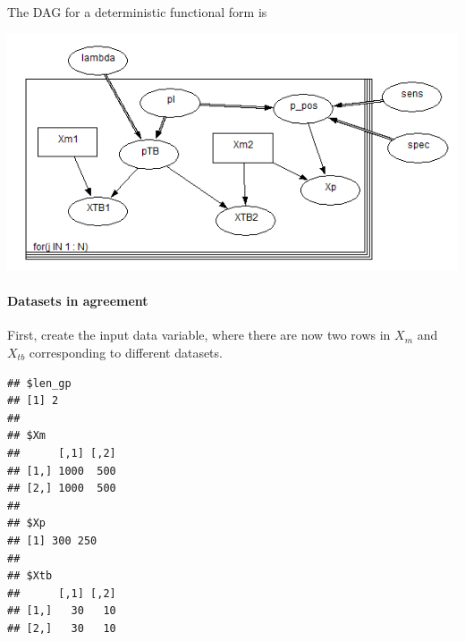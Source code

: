 \documentclass[]{article}
\newenvironment{Shaded}{\begin{snugshade}}{\end{snugshade}}
\newcommand{\CommentTok}[1]{\textcolor[rgb]{0.56,0.35,0.01}{\textit{#1}}}
\newcommand{\DataTypeTok}[1]{\textcolor[rgb]{0.13,0.29,0.53}{#1}}
\newcommand{\KeywordTok}[1]{\textcolor[rgb]{0.13,0.29,0.53}{\textbf{#1}}}
\newcommand{\NormalTok}[1]{#1}
\newcommand{\OperatorTok}[1]{\textcolor[rgb]{0.81,0.36,0.00}{\textbf{#1}}}
\newcommand{\StringTok}[1]{\textcolor[rgb]{0.31,0.60,0.02}{#1}}
\let\oldparagraph\paragraph
\renewcommand{\paragraph}[1]{\oldparagraph{#1}\mbox{}}
\begin{document}
The DAG for a deterministic functional form is

\includegraphics{DAG-full_model_pTB.PNG}

\hypertarget{datasets-in-agreement}{%
\paragraph{Datasets in agreement}\label{datasets-in-agreement}}

First, create the input data variable, where there are now two rows in
\(X_m\) and \(X_{tb}\) corresponding to different datasets.

\begin{Shaded}
\end{Shaded}

\begin{verbatim}
## $len_gp
## [1] 2
## 
## $Xm
##      [,1] [,2]
## [1,] 1000  500
## [2,] 1000  500
## 
## $Xp
## [1] 300 250
## 
## $Xtb
##      [,1] [,2]
## [1,]   30   10
## [2,]   30   10
\end{verbatim}
\end{document}
